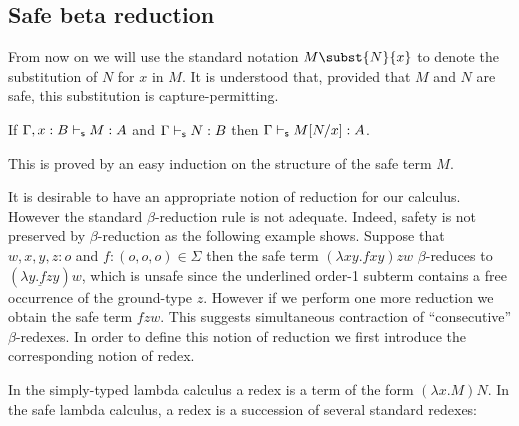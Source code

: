 \subsection*{Safe beta reduction}

From now on we will use the standard notation $M\subst{N}{x}$ to
denote the substitution of $N$ for $x$ in $M$.  It is understood that,
provided that $M$ and $N$ are safe, this substitution is
capture-permitting.


\begin{lemma}
\label{lem:subst_preserve_safety}
If $\Gamma, x :B \vdash_{\sf s} M : A$ and $\Gamma \vdash_{\sf s} N : B$ then $\Gamma \vdash_{\sf s} M[N/x] : A$.
\end{lemma}
This is proved by an easy induction on the structure of the safe term $M$.
\smallskip

It is desirable to have an appropriate notion of reduction for our
calculus. However the standard $\beta$-reduction rule is not
adequate. Indeed, safety is not preserved by $\beta$-reduction as
the following example shows. Suppose that $w,x,y,z : o$ and $f :
(o,o,o) \in \Sigma$ then the safe term $(\lambda x y . f x y) z w$
$\beta$-reduces to $(\underline{\lambda y . f z y}) w$, which is
unsafe since the underlined order-1 subterm contains a free
occurrence of the ground-type $z$. However if we perform one more
reduction we obtain the safe term $f z w$. This suggests
simultaneous contraction of ``consecutive'' $\beta$-redexes. In
order to define this notion of reduction we first introduce the
corresponding notion of redex.

In the simply-typed lambda calculus a redex is a term of the form
$(\lambda x . M) N$. In the safe lambda calculus, a redex is a
succession of several standard redexes:

